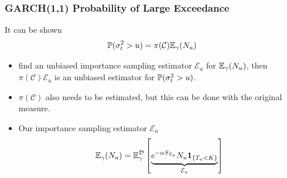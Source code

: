 \documentclass{beamer}
\begin{document}
\begin{frame}
  \frametitle{GARCH(1,1) Probability of Large Exceedance}
  It can be shown
  \[
  \P(\sigma_t^2 > u) = \pi(\mathcal C) \E_\gamma (N_u)
  \]
  \begin{itemize}
  \item find an unbiased importance sampling estimator $\mathcal E_u$ for
     $\E_\gamma (N_u)$, then $\pi(\mathcal C) \mathcal E_u$ is an unbiased estimator
     for $\P(\sigma_t^2 > u)$.
   \item $\pi(\mathcal C)$ also needs to be estimated, but this can be done with the original measure.
   \item Our importance sampling estimator $\mathcal E_u$
     \[
     \E_\gamma(N_u) = \E_\gamma^{\mathcal D} \left[
       \underbrace{
         e^{-\alpha S_{T_u}} N_u \1{T_u < K}
       }_{\mathcal E_u}
     \right]
     \]
  \end{itemize}
\end{frame}

\end{document}
